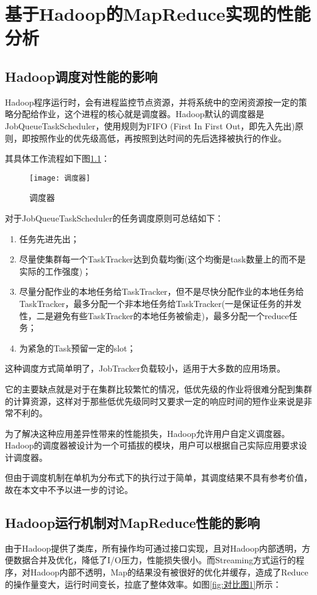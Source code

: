 \chapter{基于Hadoop的MapReduce实现的性能分析}
\label{chap:4}

\section{Hadoop调度对性能的影响}
Hadoop程序运行时，会有进程监控节点资源，并将系统中的空闲资源按一定的策略分配给作业，这个进程的核心就是调度器。Hadoop默认的调度器是JobQueueTaskScheduler，使用规则为FIFO (First In First Out，即先入先出)原则，即按照作业的优先级高低，再按照到达时间的先后选择被执行的作业。

其具体工作流程如下图\ref{fig:调度器}：
\begin{figure}[h]
 \centering
 \texttt{[image: 调度器]}
 \caption{调度器}
 \label{fig:调度器}
\end{figure}

对于JobQueueTaskScheduler的任务调度原则可总结如下：

\begin{enumerate}
\item 任务先进先出；
\item 尽量使集群每一个TaskTracker达到负载均衡(这个均衡是task数量上的而不是实际的工作强度)；
\item 尽量分配作业的本地任务给TaskTracker，但不是尽快分配作业的本地任务给TaskTracker，最多分配一个非本地任务给TaskTracker(一是保证任务的并发性，二是避免有些TaskTracker的本地任务被偷走)，最多分配一个reduce任务；
\item 为紧急的Task预留一定的slot；
\end{enumerate}

这种调度方式简单明了，JobTracker负载较小，适用于大多数的应用场景。

它的主要缺点就是对于在集群比较繁忙的情况，低优先级的作业将很难分配到集群的计算资源，这样对于那些低优先级同时又要求一定的响应时间的短作业来说是非常不利的。

为了解决这种应用差异性带来的性能损失，Hadoop允许用户自定义调度器。Hadoop的调度器被设计为一个可插拔的模块，用户可以根据自己实际应用要求设计调度器。

但由于调度机制在单机为分布式下的执行过于简单，其调度结果不具有参考价值，故在本文中不予以进一步的讨论。

\section{Hadoop运行机制对MapReduce性能的影响}
由于Hadoop提供了类库，所有操作均可通过接口实现，且对Hadoop内部透明，方便数据合并及优化，降低了I/O压力，性能损失很小。而Streaming方式运行的程序，对Hadoop内部不透明，Map的结果没有被很好的优化并缓存，造成了Reduce的操作量变大，运行时间变长，拉底了整体效率。如图\ref{fig:对比图1}所示：

